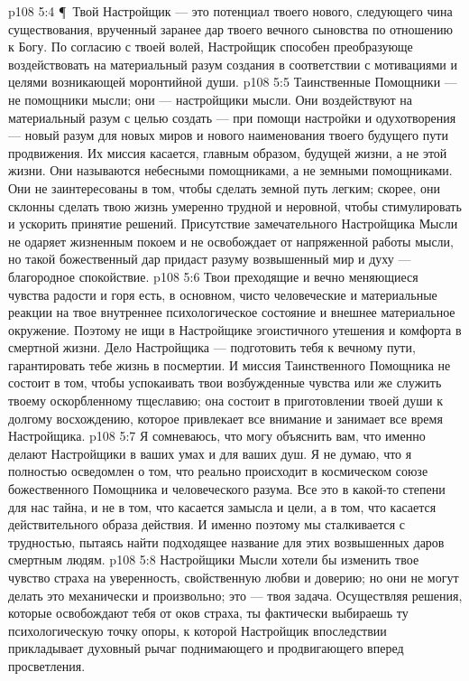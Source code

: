 \vs p108 5:4 \P\ Твой Настройщик --- это потенциал твоего нового, следующего чина существования, врученный заранее дар твоего вечного сыновства по отношению к Богу. По согласию с твоей волей, Настройщик способен преобразующе воздействовать на материальный разум создания в соответствии с мотивациями и целями возникающей моронтийной души.
\vs p108 5:5 Таинственные Помощники --- не помощники мысли; они --- настройщики мысли. Они воздействуют на материальный разум с целью создать --- при помощи настройки и одухотворения --- новый разум для новых миров и нового наименования твоего будущего пути продвижения. Их миссия касается, главным образом, будущей жизни, а не этой жизни. Они называются небесными помощниками, а не земными помощниками. Они не заинтересованы в том, чтобы сделать земной путь легким; скорее, они склонны сделать твою жизнь умеренно трудной и неровной, чтобы стимулировать и ускорить принятие решений. Присутствие замечательного Настройщика Мысли не одаряет жизненным покоем и не освобождает от напряженной работы мысли, но такой божественный дар придаст разуму возвышенный мир и духу --- благородное спокойствие.
\vs p108 5:6 Твои преходящие и вечно меняющиеся чувства радости и горя есть, в основном, чисто человеческие и материальные реакции на твое внутреннее психологическое состояние и внешнее материальное окружение. Поэтому не ищи в Настройщике эгоистичного утешения и комфорта в смертной жизни. Дело Настройщика --- подготовить тебя к вечному пути, гарантировать тебе жизнь в посмертии. И миссия Таинственного Помощника не состоит в том, чтобы успокаивать твои возбужденные чувства или же служить твоему оскорбленному тщеславию; она состоит в приготовлении твоей души к долгому восхождению, которое привлекает все внимание и занимает все время Настройщика.
\vs p108 5:7 Я сомневаюсь, что могу объяснить вам, что именно делают Настройщики в ваших умах и для ваших душ. Я не думаю, что я полностью осведомлен о том, что реально происходит в космическом союзе божественного Помощника и человеческого разума. Все это в какой\hyp{}то степени для нас тайна, и не в том, что касается замысла и цели, а в том, что касается действительного образа действия. И именно поэтому мы сталкивается с трудностью, пытаясь найти подходящее название для этих возвышенных даров смертным людям.
\vs p108 5:8 Настройщики Мысли хотели бы изменить твое чувство страха на уверенность, свойственную любви и доверию; но они не могут делать это механически и произвольно; это --- твоя задача. Осуществляя решения, которые освобождают тебя от оков страха, ты фактически выбираешь ту психологическую точку опоры, к которой Настройщик впоследствии прикладывает духовный рычаг поднимающего и продвигающего вперед просветления.
